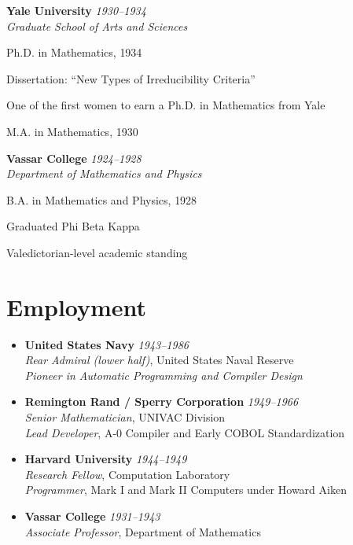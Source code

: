 \documentclass[11pt]{report}
\newenvironment{outerlist}[1][\enskip\textbullet]%
        {\begin{list}{-}{
              \setlength{\itemsep}{0pt}
              \setlength{\parsep}{1pt}
              \setlength{\topsep}{2pt}
              \setlength{\leftmargin}{2em}
             }}
          {\end{list}}
\newenvironment{innerlist}[1][\enskip\textbullet]%
        {\begin{list}{\raisebox{.1em}{{\small \textopenbullet}}}{
              \setlength{\itemsep}{0pt}
              \setlength{\parsep}{1pt}
              \setlength{\topsep}{0pt}
              \setlength{\leftmargin}{2em}
             }}
          {\end{list}}
\newcommand{\dates}[1]{\hfill \textit{#1}}
\newcommand{\position}[1]{\\\textit{#1}}
\begin{document}
\begin{itemize}

\item \textbf{Yale University} \dates{1930--1934}\\
\textit{Graduate School of Arts and Sciences}
\begin{outerlist}
\item Ph.D. in Mathematics, {1934}
  \begin{innerlist}
  \item Dissertation: “New Types of Irreducibility Criteria”
  \item One of the first women to earn a Ph.D. in Mathematics from Yale
  \end{innerlist}
\item M.A. in Mathematics, {1930}
\end{outerlist}

\item \textbf{Vassar College} \dates{1924--1928}\\
\textit{Department of Mathematics and Physics}
\begin{outerlist}
\item B.A. in Mathematics and Physics, {1928}
  \begin{innerlist}
  \item Graduated Phi Beta Kappa
  \item Valedictorian-level academic standing
  \end{innerlist}
\end{outerlist}

\end{itemize}

\section{Employment}

\begin{itemize}

\item \textbf{United States Navy} \dates{1943--1986} 
\position{Rear Admiral (lower half)}, United States Naval Reserve 
\position{Pioneer in Automatic Programming and Compiler Design}
\vspace{1em}

\item \textbf{Remington Rand / Sperry Corporation} \dates{1949--1966} 
\position{Senior Mathematician}, UNIVAC Division 
\position{Lead Developer}, A-0 Compiler and Early COBOL Standardization
\vspace{1em}

\item \textbf{Harvard University} \dates{1944--1949} 
\position{Research Fellow}, Computation Laboratory 
\position{Programmer}, Mark I and Mark II Computers under Howard Aiken
\vspace{1em}

\item \textbf{Vassar College} \dates{1931--1943} 
\position{Associate Professor}, Department of Mathematics
\vspace{1em}

\end{itemize}
\end{document}
